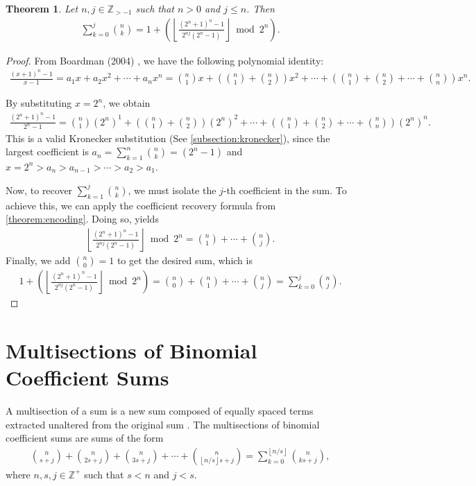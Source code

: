 \documentclass[10pt,a4paper]{article}
\theoremstyle{plain}
\newtheorem{theorem}{Theorem}[section]
\newcommand{\floor}[1]{\left\lfloor #1 \right\rfloor}
\newcommand{\Z}{\mathbb{Z}}
\begin{document}
\begin{theorem} \label{proof:binomialcoeffpartialsums2}
Let $n,j \in \Z_{>-1}$ such that $n>0$ and $j \leq n$. Then
\begin{align*}
\sum_{k=0}^{j} \binom{n}{k} = 1 + \left( \floor{ \frac{(2^n+1)^n - 1}{2^{nj}(2^n-1)} } \bmod 2^n \right) .
\end{align*}
\end{theorem}
\begin{proof}
From Boardman (2004) \cite{boardman2004eggdropnumbers}, we have the following polynomial identity:
\begin{align*}
\frac{(x+1)^n - 1}{x-1} = 
a_1 x
+ a_2 x^2
+ \cdots
+ a_n x^n =
\binom{n}{1} x
+ \left( \binom{n}{1} + \binom{n}{2} \right) x^2
+ \cdots
+ \left( \binom{n}{1} + \binom{n}{2} + \cdots + \binom{n}{n} \right) x^n .
\end{align*}

By substituting $x=2^n$, we obtain
\begin{align*}
\frac{(2^n+1)^n - 1}{2^n-1} = 
\binom{n}{1} (2^n)^1
+ \left( \binom{n}{1} + \binom{n}{2} \right) (2^n)^2
+ \cdots
+ \left( \binom{n}{1} + \binom{n}{2} + \cdots + \binom{n}{n} \right) (2^n)^n .
\end{align*}
This is a valid Kronecker substitution (See \cref{subsection:kronecker}), since the largest coefficient is $a_n = \sum_{k=1}^n \binom{n}{k} = (2^n-1)$ and $x=2^n > a_n > a_{n-1} > \cdots > a_2 > a_1$.

Now, to recover $\sum_{k=1}^j \binom{n}{k}$, we must isolate the $j$-th coefficient in the sum. To achieve this, we can apply the coefficient recovery formula from \cref{theorem:encoding}. Doing so, yields
\begin{align*}
\floor{ \frac{(2^n+1)^n - 1}{2^{nj}(2^n-1)} } \bmod 2^n = 
\binom{n}{1} + \cdots + \binom{n}{j} .
\end{align*}
Finally, we add $\binom{n}{0} = 1$ to get the desired sum, which is
\begin{align*}
1 + \left( \floor{ \frac{(2^n+1)^n - 1}{2^{nj}(2^n-1)} } \bmod 2^n \right) = 
\binom{n}{0} + \binom{n}{1} + \cdots + \binom{n}{j} = \sum_{k=0}^j \binom{n}{j} .
\end{align*}
\end{proof}

\section{Multisections of Binomial Coefficient Sums} \label{section:multisectionsums}
A multisection of a sum is a new sum composed of equally spaced terms extracted unaltered from the original sum \cite{wikipedia2024seriesmultisection}. The multisections of binomial coefficient sums are sums of the form
\begin{align*}
\binom{n}{s+j} + \binom{n}{2s+j} + \binom{n}{3s+j} + \cdots + \binom{n}{\floor{n/s}s+j}
= \sum_{k=0}^{\floor{n/s}} \binom{n}{ks+j} ,
\end{align*}
where $n,s,j \in \Z^+$ such that $s < n$ and $j < s$.
\end{document}
